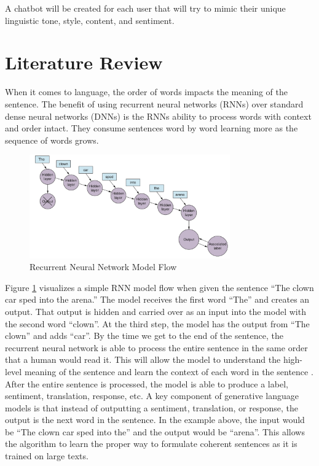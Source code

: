 \documentclass[5p,authoryear]{elsarticle}
\begin{document}
A chatbot will be created for each user that will try to mimic their unique linguistic tone, style, content, and sentiment.


\section{Literature Review} \label{lit_rev}

When it comes to language, the order of words impacts the meaning of the sentence. The benefit of using recurrent neural networks (RNNs) over standard dense neural networks (DNNs) is the RNNs ability to process words with context and order intact. They consume sentences word by word learning more as the sequence of words grows.


\begin{figure}[!h] 
    \centering
	\includegraphics[width=3.4in]{figures/RNN_Flow.png}
	\caption[]{Recurrent Neural Network Model Flow} 
	\label{RNN_flow} 
\end{figure}

Figure \ref{RNN_flow} visualizes a simple RNN model flow when given the sentence “The clown car sped into the arena.” The model receives the first word “The” and creates an output. That output is hidden and carried over as an input into the model with the second word “clown”. At the third step, the model has the output from “The clown” and adds “car”. By the time we get to the end of the sentence, the recurrent neural network is able to process the entire sentence in the same order that a human would read it. This will allow the model to understand the high-level meaning of the sentence and learn the context of each word in the sentence \citep{chollet}. After the entire sentence is processed, the model is able to produce a label, sentiment, translation, response, etc. A key component of generative language models is that instead of outputting a sentiment, translation, or response, the output is the next word in the sentence. In the example above, the input would be “The clown car sped into the” and the output would be “arena”. This allows the algorithm to learn the proper way to formulate coherent sentences as it is trained on large texts. 
\end{document}
